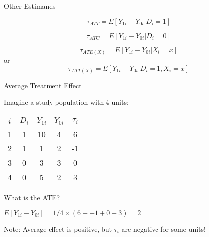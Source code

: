 \documentclass{beamer}
\numberwithin{equation}{section}
\begin{document}
\begin{frame}{Other Estimands}
\small
\begin{definition}

$$ \tau_{ATT} = E[Y_{1i} - Y_{0i} | D_i = 1]$$

\end{definition}

\pause

\begin{definition}

$$ \tau_{ATC} = E[Y_{1i} - Y_{0i} | D_i = 0]$$

\end{definition}

\pause

\begin{definition}
    {\centering
    $$ \tau_{ATE(X)} = E[Y_{1i} - Y_{0i} | X_i = x]$$
    or 
        $$ \tau_{ATT(X)} = E[Y_{1i} - Y_{0i} | D_i = 1, X_i = x]$$
}
\end{definition}

\end{frame}

\begin{frame}{Average Treatment Effect}

Imagine a study population with 4 units:

\begin{table}[ht]
    \centering
    \begin{tabular}{c  c c c c }
      $i$ & $D_i$ & $Y_{1i}$ & $Y_{0i}$ & $\tau_i$ \\ \hline
      1  & 1 & 10  & 4 & 6 \\
      2  & 1 & 1  & 2 & -1 \\
      3 & 0 & 3 & 3 & 0 \\
      4 & 0 & 5 & 2 & 3 \\
    \end{tabular}
    \end{table}

What is the ATE?\medskip

\pause

$E[Y_{1i} - Y_{0i}] = 1/4 \times (6 + -1 + 0 + 3) = 2$\medskip

\pause

Note: Average effect is positive, but $\tau_i$ are negative for some
units!

\end{frame}
\end{document}
